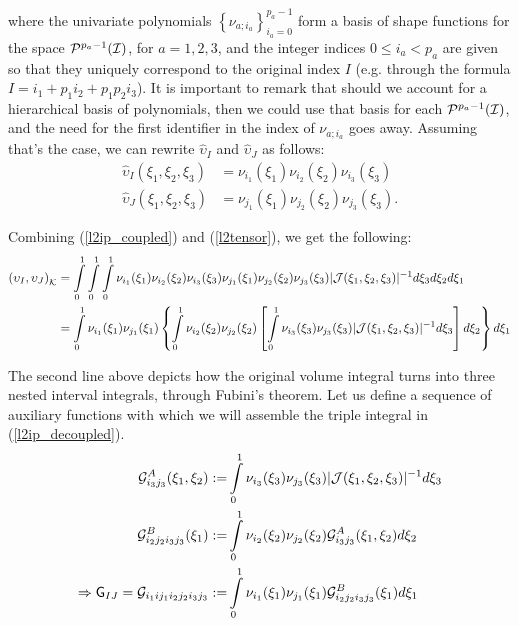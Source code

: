 \noindent where the univariate polynomials $\left\{\nu_{a;i_a}\right\}_{i_a=0}^{p_a-1}$ form a basis of shape functions for the space $\mathcal{P}^{p_a-1}(\mathcal{I})$, for $a=1,2,3$, and the integer indices $0\leq i_a<p_a$ are given so that they uniquely correspond to the original index $I$ (e.g. through the formula $I=i_1+p_1i_2+p_1p_2i_3$).
It is important to remark that should we account for a hierarchical basis of polynomials, then we could use that basis for each $\mathcal{P}^{p_a-1}(\mathcal{I})$, and the need for the first identifier in the index of $\nu_{a;i_a}$ goes away. Assuming that's the case, we can rewrite $\hat{\upsilon}_I$ and $\hat{\upsilon}_J$ as follows:
% 
\begin{equation}
    \begin{aligned}
    \hat{\upsilon}_I(\xi_1,\xi_2,\xi_3)&= \nu_{i_1}(\xi_1)\nu_{i_2}(\xi_2)\nu_{i_3}(\xi_3)\\
    \hat{\upsilon}_J(\xi_1,\xi_2,\xi_3)&= \nu_{j_1}(\xi_1)\nu_{j_2}(\xi_2)\nu_{j_3}(\xi_3).
    \end{aligned}
    \label{l2tensor}
\end{equation}

Combining (\ref{l2ip_coupled}) and (\ref{l2tensor}), we get the following:
% 
\begin{equation}
    \begin{aligned}
        \left(\upsilon_I,\upsilon_J\right)_{\mathcal{K}}&= 
             \int\limits_0^1\int\limits_0^1\int\limits_0^1\nu_{i_1}(\xi_1)\nu_{i_2}(\xi_2)\nu_{i_3}(\xi_3) \nu_{j_1}(\xi_1)\nu_{j_2}(\xi_2)\nu_{j_3}(\xi_3)|\mathcal{J}(\xi_1,\xi_2,\xi_3)|^{-1} d\xi_3d\xi_2d\xi_1 \\
        \ &= \int\limits_0^1\nu_{i_1}(\xi_1)\nu_{j_1}(\xi_1)\left\{\int\limits_0^1\nu_{i_2}(\xi_2)\nu_{j_2}(\xi_2)\left[\int\limits_0^1 \nu_{i_3}(\xi_3) \nu_{j_3}(\xi_3)|\mathcal{J}(\xi_1,\xi_2,\xi_3)|^{-1} d\xi_3\right]d\xi_2\right\}d\xi_1
    \end{aligned}
    \label{l2ip_decoupled}
\end{equation}

The second line above depicts how the original volume integral turns into three nested interval integrals, through Fubini's theorem. Let us define a sequence of auxiliary functions with which we will assemble the triple integral in (\ref{l2ip_decoupled}).
% 
\begin{align}
        \mathcal{G}_{i_3j_3}^A(\xi_1,\xi_2):=&\int\limits_0^1 \nu_{i_3}(\xi_3)\nu_{j_3}(\xi_3)|\mathcal{J}(\xi_1,\xi_2,\xi_3)|^{-1}d\xi_3  \label{GA_l2}  \\
        \mathcal{G}_{i_2j_2i_3j_3}^B(\xi_1):=&\int\limits_0^1 \nu_{i_2}(\xi_2)\nu_{j_2}(\xi_2)\mathcal{G}_{i_3j_3}^A(\xi_1,\xi_2)d\xi_2 \label{GB_l2} \\        
        \Rightarrow \mathsf{G}_{IJ}=\mathcal{G}_{i_1ij_1i_2j_2i_3j_3}:=& \int\limits_0^1 \nu_{i_1}(\xi_1)\nu_{j_1}(\xi_1)\mathcal{G}_{i_2j_2i_3j_3}^B(\xi_1)d\xi_1    \label{ip_l2_GAB}
\end{align}

